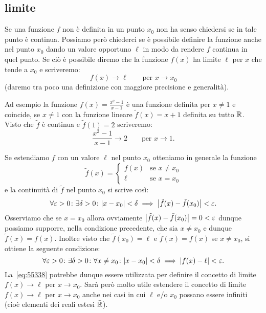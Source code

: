   \subsection{limite}

Se una funzione $f$ non è definita in un punto $x_0$ non ha senso chiedersi
se in tale punto è continua. 
Possiamo però chiederci se è possibile definire la funzione anche nel punto 
$x_0$ dando un valore opportuno $\ell$ in modo da rendere $f$ continua 
in quel punto. 
Se ciò è possibile diremo che la funzione $f(x)$ ha limite $\ell$ 
per $x$ che tende a $x_0$ e scriveremo:
\[
  f(x) \to \ell \qquad \text{per $x\to x_0$}
\]
(daremo tra poco una definizione con maggiore precisione e generalità).

Ad esempio la funzione $f(x) = \frac{x^2-1}{x-1}$ è una funzione definita per $x\neq 1$
e coincide, se $x\neq 1$ con la funzione lineare $\tilde f(x) = x+1$ definita 
su tutto ${\mathbb R}$. 
Visto che $\tilde f$ è continua e $\tilde f(1)=2$
scriveremo:
\[
  \frac{x^2-1}{x-1} \to 2
  \qquad \text{per $x\to 1$.}
\]

Se estendiamo $f$ con un valore $\ell$ nel punto $x_0$ otteniamo 
in generale la funzione 
\[
  \tilde f(x) = \begin{cases}
    f(x) & \text{se $x\neq x_0$}\\
    \ell & \text{se $x=x_0$}
  \end{cases}  
\]
e la continuità di $\tilde f$ nel punto $x_0$ si scrive così:
\[
\forall\varepsilon>0\colon \exists \delta>0\colon
{\left|x-x_0\right|}<\delta \implies {\left|\tilde f(x)-\tilde f(x_0)\right|}<\varepsilon.  
\]
Osserviamo che se $x=x_0$ allora ovviamente ${\left|\tilde f(x)-\tilde f(x_0)\right|}
= 0 < \varepsilon$ dunque possiamo supporre, nella condizione precedente, 
che sia $x\neq x_0$ e dunque $\tilde f(x)=f(x)$. 
Inoltre visto che $\tilde f(x_0)=\ell$ 
e $\tilde f(x)=f(x)$ se $x\neq x_0$,
si ottiene 
la seguente condizione:
\begin{equation}\label{eq:55338}
\forall \varepsilon>0\colon \exists \delta >0 \colon 
  \forall x\neq x_0\colon
  {\left|x-x_0\right|}<\delta \implies {\left|f(x) - \ell\right|} < \varepsilon.
\end{equation}
La~\eqref{eq:55338} potrebbe dunque essere utilizzata per definire 
il concetto di limite $f(x)\to \ell$ per $x\to x_0$.
Sarà però molto utile estendere il concetto di limite $f(x)\to \ell$ 
per $x\to x_0$ anche nei casi in cui $\ell$ e/o $x_0$ possano 
essere infiniti (cioè elementi dei reali estesi $\bar {{\mathbb R}}$).

